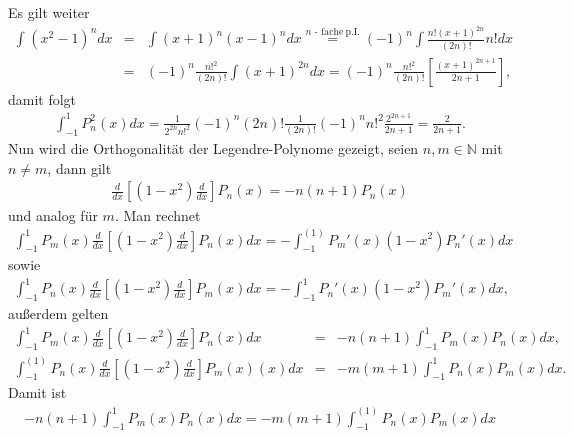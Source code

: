 \documentclass{book}
\begin{document}
%
Es gilt weiter
%
\begin{eqnarray}
\int_{}^{}\left(x^2 - 1\right)^ndx & = & \int\left(x + 1\right)^n\left(x - 1\right)^ndx\stackrel{n\text{ - fache}\:\text{p.I}.}{=}\left(-1\right)^n\int\frac{n!\left(x + 1\right)^{2n}}{\left(2n\right)!}n!dx\nonumber\\
& = & \left(-1\right)^n\frac{n!^2}{\left(2n\right)!}\int\left(x + 1\right)^{2n}dx = \left(-1\right)^n\frac{n!^2}{\left(2n\right)!}\left[\frac{\left(x + 1\right)^{2n + 1}}{2n + 1}\right], 
\end{eqnarray}
%
damit folgt
%
\begin{eqnarray}
\int_{-1}^{1}P_n^2\left(x\right)dx = \frac{1}{2^{2n}n!^2}\left(-1\right)^{n}\left(2n\right)!\frac{1}{\left(2n\right)!}\left(-1\right)^nn!^2\frac{2^{2n + 1}}{2n + 1} = \frac{2}{2n + 1}.
\end{eqnarray}
%
Nun wird die Orthogonalität der Legendre-Polynome gezeigt, seien $n, m\in\mathbb{N}$ mit $n \not = m$, dann gilt
%
\begin{eqnarray}
\frac{d}{dx}\left[\left(1 - x^2\right)\frac{d}{dx}\right]P_n\left(x\right) = -n\left(n + 1\right)P_n\left(x\right)
\end{eqnarray}
%
und analog für $m$. Man rechnet
%
\begin{eqnarray}
\int_{-1}^{1}P_m\left(x\right)\frac{d}{dx}\left[\left(1 - x^2\right)\frac{d}{dx}\right]P_n\left(x\right)dx = -\int_{-1}^{\left(1\right)}P_m'\left(x\right)\left(1 - x^2\right)P_n'\left(x\right)dx
\end{eqnarray}
%
sowie
%
\begin{eqnarray}
\int_{-1}^{1}P_n\left(x\right)\frac{d}{dx}\left[\left(1 - x^2\right)\frac{d}{dx}\right]P_m\left(x\right)dx = -\int_{-1}^{1}P_n'\left(x\right)\left(1 - x^2\right)P_m'\left(x\right)dx, 
\end{eqnarray}
%
außerdem gelten
%
\begin{eqnarray}
\int_{-1}^{1}P_m\left(x\right)\frac{d}{dx}\left[\left(1 - x^2\right)\frac{d}{dx}\right]P_n\left(x\right)dx & = & -n\left(n + 1\right)\int_{-1}^{1}P_m\left(x\right)P_n\left(x\right)dx,\\
\int_{-1}^{\left(1\right)}P_n\left(x\right)\frac{d}{dx}\left[\left(1 - x^2\right)\frac{d}{dx}\right]P_m\left(x\right)\left(x\right)dx & = & -m\left(m + 1\right)\int_{-1}^{1}P_n\left(x\right)P_m\left(x\right)dx.
\end{eqnarray}
%
Damit ist
%
\begin{eqnarray}
- n\left(n + 1\right)\int_{-1}^{1}P_m\left(x\right)P_n\left(x\right)dx = -m\left(m + 1\right)\int_{-1}^{\left(1\right)}P_n\left(x\right)P_m\left(x\right)dx
\end{eqnarray}
\end{document}
